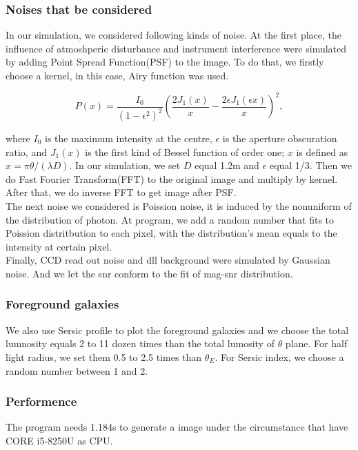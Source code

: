 \documentclass[a4paper,fleqn,usenatbib]{mnras}
\begin{document}
\subsubsection{Noises that be considered}
In our simulation, we considered following kinds of noise. At the first place, the influence of atmoshperic disturbance and instrument interference were simulated by adding Point Spread Function(PSF) to the image. To do that, we firstly choose a kernel, in this case, Airy function was used. 
\begin{center}
\begin{equation}
P(x)=\frac{I_0}{(1-\epsilon^2)^2}(\frac{2J_1(x)}{x}-\frac{2\epsilon{J_1(\epsilon{x})}}{x})^2,
\end{equation}
\end{center}
where $I_0$ is the maximum intensity at the centre, $\epsilon$ is the aperture obscuration ratio, and $J_1(x)$ is the first kind of Bessel function of order one; $x$ is defined as $x=\pi\theta/(\lambda{D})$. In our simulation, we set $D$ equal 1.2m and $\epsilon$ equal 1/3.
Then we do Fast Fourier Transform(FFT) to the original image and multiply by kernel. After that, we do inverse FFT to get image after PSF.\\
The next noise we considered is Poission noise, it is induced by the nonuniform of the distribution of photon. At program, we add a random number that fits to Poission distritbution to each pixel, with the distribution's mean equals to the intensity at certain pixel.\\
Finally, CCD read out noise and dll background were simulated by Gaussian noise. And we let the snr conform to the fit of mag-snr distribution.
\subsubsection{Foreground galaxies}
We also use Sersic profile to plot the foreground galaxies and we choose the total lumnosity equals 2 to 11 dozen times than the total lumosity of $\theta$ plane. For half light radius, we set them 0.5 to 2.5 times than $\theta_E$. For Sersic index, we choose a random number between 1 and 2.
\subsubsection{Performence}
The program needs 1.184s to generate a image under the circumstance that have CORE i5-8250U as CPU. 
\end{document}
